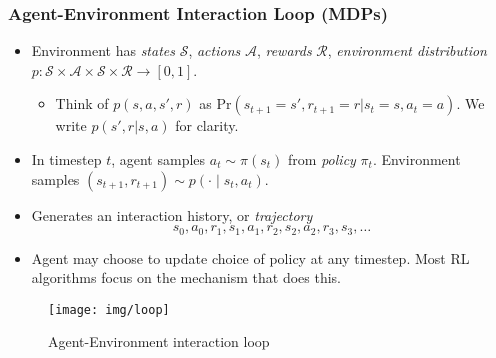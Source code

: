 \documentclass[10pt,a4paper, handout]{beamer}
\renewcommand{\S}{\mathcal{S}}
\newcommand{\A}{\mathcal{A}}
\newcommand{\R}{\mathcal{R}}
\renewcommand{\Pr}{\text{Pr}}
\begin{document}
\begin{frame}
	\frametitle{Agent-Environment Interaction Loop (MDPs)}
	\begin{itemize}
		\item Environment has \textit{states} $\S$,
		\textit{actions} $\A$, \textit{rewards} $\R$, \textit{environment
		distribution}
		$p : \S \times \A \times \S \times \R  \to [0,1]$. 
		\pause
		\begin{itemize}
		\item Think of $p(s,a,s',r)$ as 
		$\Pr(s_{t+1} = s',r_{t+1} = r | s_t = s, a_t = a)$.
		We write $p(s',r | s,a)$ for clarity.
		\end{itemize}
		\pause
		\item In timestep $t$, agent samples $a_t \sim \pi(s_t)$ 
		from \textit{policy} $\pi_t$. Environment samples 
		$(s_{t+1}, r_{t+1}) \sim p(\cdot \mid s_t,a_t)$.
		\pause
		\item Generates an interaction history, or \textit{trajectory}
		$$
		s_0, a_0, r_1, s_1, a_1, r_2, s_2, a_2, r_3, s_3, \ldots
		$$
		\pause
		\item Agent may choose to update choice of policy at any timestep.
		Most RL algorithms focus on the mechanism that does this.
		\pause
	\end{itemize}
		\begin{figure}
			\centering
			\texttt{[image: img/loop]}
			\caption{Agent-Environment interaction loop}
			\label{fig:loop}
		\end{figure}
		
\end{frame}
\end{document}

